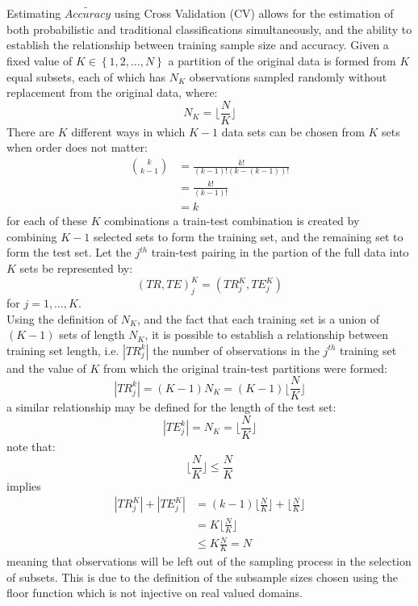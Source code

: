 \documentclass[12pt,]{article}
\begin{document}
Estimating \(\tilde{Accuracy}\) using Cross Validation (CV) allows for
the estimation of both probabilistic and traditional classifications
simultaneously, and the ability to establish the relationship between
training sample size and accuracy. Given a fixed value of
\(K \in \left \{ 1, 2, \ldots, N \right \}\) a partition of the original
data is formed from \(K\) equal subsets, each of which has \(N_{K}\)
observations sampled randomly without replacement from the original
data, where: \[N_{K}=\Big \lfloor \frac{N}{K} \Big \rfloor\] There are
\(K\) different ways in which \(K-1\) data sets can be chosen from \(K\)
sets when order does not matter: \begin{align*}
\binom{k}{k-1} &= \frac{k!}{(k-1)!(k-(k-1))!}\\[0.5em]
&= \frac{k!}{(k-1)!}\\[0.5em]
&= k
\end{align*} for each of these \(K\) combinations a train-test
combination is created by combining \(K-1\) selected sets to form the
training set, and the remaining set to form the test set. Let the
\(j^{th}\) train-test pairing in the partion of the full data into \(K\)
sets be represented by:
\[\left(TR, TE \right)^{K}_{j}=\left(TR_{j}^{K}, TE_{j}^{K} \right) \]
for \(j=1, \ldots, K\).\\
Using the definition of \(N_{K}\), and the fact that each training set
is a union of \(\left(K-1 \right)\) sets of length \(N_{K}\), it is
possible to establish a relationship between training set length, i.e.
\(|TR_{j}^{k}|\) the number of observations in the \(j^{th}\) training
set and the value of \(K\) from which the original train-test partitions
were formed:\\
\[|TR_{j}^{k}|=(K-1)N_{K}=(K-1)\Big \lfloor \frac{N}{K} \Big \rfloor\] a
similar relationship may be defined for the length of the test set:
\[|TE_{j}^{k}|=N_{K}=\Big \lfloor \frac{N}{K} \Big \rfloor\] note that:
\[\Big \lfloor \frac{N}{K} \Big \rfloor \leq \frac{N}{K}\] implies
\begin{align*}
|TR_{j}^{K}| + |TE_{j}^{K}| &= (k-1)\Big \lfloor \frac{N}{K} \Big \rfloor + \Big \lfloor \frac{N}{K} \Big \rfloor \\[0.5em]
&= K \Big \lfloor \frac{N}{K} \Big \rfloor \\[0.5em]
&\leq K \frac{N}{K} = N
\end{align*} meaning that observations will be left out of the sampling
process in the selection of subsets. This is due to the definition of
the subsample sizes chosen using the floor function which is not
injective on real valued domains.
\end{document}

